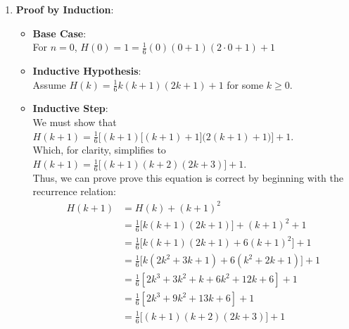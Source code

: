 \documentclass{article}
\begin{document}
\begin{enumerate}
\begin{enumerate}
        \item \textbf{Proof by Induction}: 
        \begin{itemize}
            \item \textbf{Base Case}: \\
            For $n = 0$, $H(0) = 1 = \frac{1}{6}(0)(0+1)(2\cdot 0 + 1) + 1$ \\
            \item \textbf{Inductive Hypothesis}: \\
            Assume $H(k) = \frac{1}{6}k(k+1)(2k+1) +1$ for some $k \geq 0$.\\
            \item \textbf{Inductive Step}: \\
            We must show that $H(k + 1) = \frac{1}{6}\Big[(k+1)\big[(k+1) + 1\big]\big(2(k+1) + 1\big)\Big] + 1$. \\
            
            Which, for clarity, simplifies to $H(k+1) = \frac{1}{6}\big[(k+1)(k+2)(2k+3)\big] + 1$. \\

            Thus, we can prove prove this equation is correct by beginning with the recurrence relation:
            \begin{align*}
                H(k+1) &= H(k) + (k + 1)^2 \\
                &= \frac{1}{6}\big[k(k + 1)(2k + 1)\big] + (k + 1)^2 + 1 \\
                &= \frac{1}{6}\big[k(k + 1)(2k + 1) + 6(k + 1)^2\big] + 1 \\
                &= \frac{1}{6}\big[k(2k^2 + 3k + 1) + 6(k^2 + 2k + 1)\big] + 1 \\
                &= \frac{1}{6}[2k^3 + 3k^2 + k + 6k^2 + 12k + 6] + 1 \\
                &= \frac{1}{6}[2k^3 + 9k^2 + 13k + 6] + 1 \\
                &= \frac{1}{6}\big[(k+1)(k+2)(2k+3)\big] + 1
            \end{align*}
        \end{itemize}
    \end{enumerate}
\end{enumerate}
\end{document}
